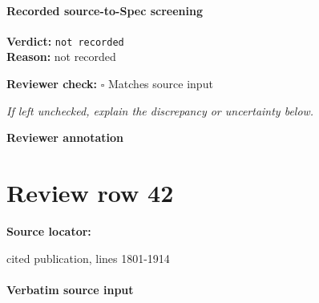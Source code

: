 \documentclass[10pt]{article}
\newcommand{\reviewerbox}{%
  \par\noindent\fbox{\parbox{0.96\linewidth}{\rule{0pt}{0.38in}}}\par
}
\newcommand{\reviewmatch}[1]{%
  \par\noindent\textbf{Reviewer check:} $\square$\; #1\par
  \noindent\emph{If left unchecked, explain the discrepancy or uncertainty below.}\par
}
\begin{document}
\paragraph{Recorded source-to-Spec screening}
\textbf{Verdict:} \texttt{not recorded}
\\
\textbf{Reason:} not recorded
\reviewmatch{Matches source input}
\noindent\textbf{Reviewer annotation}\par
\reviewerbox
\clearpage
\hypertarget{source-claim-4139a609895b0de6}{}
\section*{Review row 42}
\textbf{Source locator:} {\footnotesize\raggedright cited publication, lines 1801-\allowbreak{}1914\par}
\paragraph{Verbatim source input}
\end{document}
